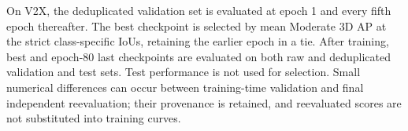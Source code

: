 On V2X, the deduplicated validation set is evaluated at epoch 1 and every fifth epoch thereafter. The best checkpoint is selected by mean Moderate 3D AP at the strict class-specific IoUs, retaining the earlier epoch in a tie. After training, best and epoch-80 last checkpoints are evaluated on both raw and deduplicated validation and test sets. Test performance is not used for selection. Small numerical differences can occur between training-time validation and final independent reevaluation; their provenance is retained, and reevaluated scores are not substituted into training curves.





